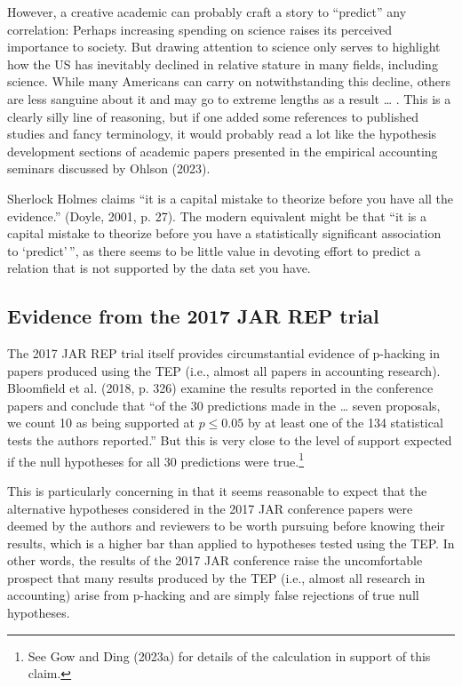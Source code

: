 \documentclass[
  letterpaper,
  DIV=11,
  numbers=noendperiod]{scrartcl}
\begin{document}
However, a creative academic can probably craft a story to ``predict''
any correlation: Perhaps increasing spending on science raises its
perceived importance to society. But drawing attention to science only
serves to highlight how the US has inevitably declined in relative
stature in many fields, including science. While many Americans can
carry on notwithstanding this decline, others are less sanguine about it
and may go to extreme lengths as a result \ldots{} . This is a clearly
silly line of reasoning, but if one added some references to published
studies and fancy terminology, it would probably read a lot like the
hypothesis development sections of academic papers presented in the
empirical accounting seminars discussed by Ohlson (2023).

Sherlock Holmes claims ``it is a capital mistake to theorize before you
have all the evidence.'' (Doyle, 2001, p. 27). The modern equivalent
might be that ``it is a capital mistake to theorize before you have a
statistically significant association to `predict'\,'', as there seems
to be little value in devoting effort to predict a relation that is not
supported by the data set you have.

\hypertarget{evidence-from-the-2017-jar-rep-trial}{%
\subsection{Evidence from the 2017 JAR REP
trial}\label{evidence-from-the-2017-jar-rep-trial}}

The 2017 JAR REP trial itself provides circumstantial evidence of
p-hacking in papers produced using the TEP (i.e., almost all papers in
accounting research). Bloomfield et al. (2018, p. 326) examine the
results reported in the conference papers and conclude that ``of the 30
predictions made in the \ldots{} seven proposals, we count 10 as being
supported at \(p \leq 0.05\) by at least one of the 134 statistical
tests the authors reported.'' But this is very close to the level of
support expected if the null hypotheses for all 30 predictions were
true.\footnote{See Gow and Ding (2023a) for details of the calculation
  in support of this claim.}

This is particularly concerning in that it seems reasonable to expect
that the alternative hypotheses considered in the 2017 JAR conference
papers were deemed by the authors and reviewers to be worth pursuing
before knowing their results, which is a higher bar than applied to
hypotheses tested using the TEP. In other words, the results of the 2017
JAR conference raise the uncomfortable prospect that many results
produced by the TEP (i.e., almost all research in accounting) arise from
p-hacking and are simply false rejections of true null hypotheses.
\end{document}
